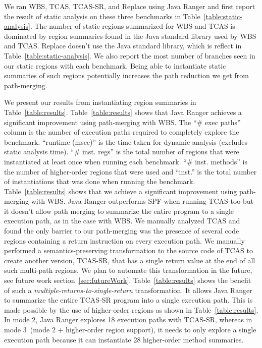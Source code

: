 We ran WBS, TCAS, TCAS-SR, and Replace using Java Ranger and first report the result of static analysis on these
three benchmarks in Table~\ref{table:static-analysis}.
%
The number of static regions summarized for WBS and TCAS is dominated by region summaries found in the Java standard
library used by WBS and TCAS.
%
Replace doesn't use the Java standard library, which is reflect in Table~\ref{table:static-analysis}.
%
We also report the most number of branches seen in our static regions with each benchmark.
%
Being able to instantiate static summaries of such regions potentially increases the path reduction we get from path-merging.

We present our results from instantiating region summaries in Table~\ref{table:results}.
%
Table~\ref{table:results} shows that Java Ranger achieves a significant improvement using path-merging with WBS.
%
The ``\# exec paths'' column is the number of execution paths required to completely explore the benchmark.
%
``runtime (msec)'' is the time taken for dynamic analysis (excludes static analysis time).
%
``\# inst. regs'' is the total number of regions that were instantiated at least once when running each benchmark.
%
``\# inst. methods'' is the number of higher-order regions that were used and ``inst.'' is the total number of
instantiations that was done when running the benchmark.
%
Table~\ref{table:results} shows that we achieve a significant improvement using path-merging with WBS.
%
Java Ranger outperforms SPF when running TCAS too but it doesn't allow path merging to summarize the entire program
to a single execution path, as in the case with WBS.
%
We manually analyzed TCAS and found the only barrier to our path-merging was the presence of several code
regions containing a return instruction on every execution path.
%
We manually performed a semantics-preserving transformation to the source code of TCAS to create another version, TCAS-SR,
that has a single return value at the end of all such multi-path regions.
%
We plan to automate this transformation in the future, see future work section~\ref{sec:futureWork}.
%
Table~\ref{table:results} shows the benefit of such a \textit{multiple-returns-to-single-return} transformation.
%
It allows Java Ranger to summarize the entire TCAS-SR program into a single execution path.
%
This is made possible by the use of higher-order regions as shown in Table~\ref{table:results}.
%
In mode 2, Java Ranger explores 18 execution paths with TCAS-SR, whereas in mode 3~(mode 2 + higher-order region support), it needs to only explore a single
execution path because it can instantiate 28 higher-order method summaries.
